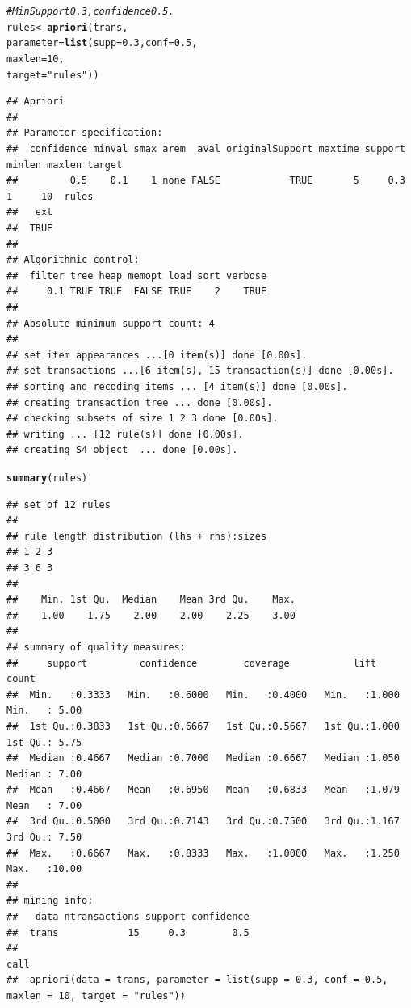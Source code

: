 \documentclass{article}\usepackage[]{graphicx}\usepackage[]{xcolor}
\makeatletter
\newcommand{\hlnum}[1]{\textcolor[rgb]{0.686,0.059,0.569}{#1}}%
\newcommand{\hlstr}[1]{\textcolor[rgb]{0.192,0.494,0.8}{#1}}%
\newcommand{\hlcom}[1]{\textcolor[rgb]{0.678,0.584,0.686}{\textit{#1}}}%
\newcommand{\hlstd}[1]{\textcolor[rgb]{0.345,0.345,0.345}{#1}}%
\newcommand{\hlkwb}[1]{\textcolor[rgb]{0.69,0.353,0.396}{#1}}%
\newcommand{\hlkwc}[1]{\textcolor[rgb]{0.333,0.667,0.333}{#1}}%
\newcommand{\hlkwd}[1]{\textcolor[rgb]{0.737,0.353,0.396}{\textbf{#1}}}%
\newenvironment{kframe}{%
 \def\at@end@of@kframe{}%
 \ifinner\ifhmode%
  \def\at@end@of@kframe{\end{minipage}}%
  \begin{minipage}{\columnwidth}%
 \fi\fi%
 \def\FrameCommand##1{\hskip\@totalleftmargin \hskip-\fboxsep
 \colorbox{shadecolor}{##1}\hskip-\fboxsep
     \hskip-\linewidth \hskip-\@totalleftmargin \hskip\columnwidth}%
 \MakeFramed {\advance\hsize-\width
   \@totalleftmargin\z@ \linewidth\hsize
   \@setminipage}}%
 {\par\unskip\endMakeFramed%
 \at@end@of@kframe}
\newenvironment{knitrout}{}{} %
\makeatother
\begin{document}
\begin{knitrout}
\begin{kframe}
\begin{alltt}
\hlcom{#Min Support 0.3, confidence 0.5.}
\hlstd{rules} \hlkwb{<-} \hlkwd{apriori}\hlstd{(trans,}
                 \hlkwc{parameter} \hlstd{=} \hlkwd{list}\hlstd{(}\hlkwc{supp}\hlstd{=}\hlnum{0.3}\hlstd{,} \hlkwc{conf}\hlstd{=}\hlnum{0.5}\hlstd{,}
                                  \hlkwc{maxlen}\hlstd{=}\hlnum{10}\hlstd{,}
                                  \hlkwc{target}\hlstd{=} \hlstr{"rules"}\hlstd{))}
\end{alltt}
\begin{verbatim}
## Apriori
## 
## Parameter specification:
##  confidence minval smax arem  aval originalSupport maxtime support minlen maxlen target
##         0.5    0.1    1 none FALSE            TRUE       5     0.3      1     10  rules
##   ext
##  TRUE
## 
## Algorithmic control:
##  filter tree heap memopt load sort verbose
##     0.1 TRUE TRUE  FALSE TRUE    2    TRUE
## 
## Absolute minimum support count: 4 
## 
## set item appearances ...[0 item(s)] done [0.00s].
## set transactions ...[6 item(s), 15 transaction(s)] done [0.00s].
## sorting and recoding items ... [4 item(s)] done [0.00s].
## creating transaction tree ... done [0.00s].
## checking subsets of size 1 2 3 done [0.00s].
## writing ... [12 rule(s)] done [0.00s].
## creating S4 object  ... done [0.00s].
\end{verbatim}
\begin{alltt}
\hlkwd{summary}\hlstd{(rules)}
\end{alltt}
\begin{verbatim}
## set of 12 rules
## 
## rule length distribution (lhs + rhs):sizes
## 1 2 3 
## 3 6 3 
## 
##    Min. 1st Qu.  Median    Mean 3rd Qu.    Max. 
##    1.00    1.75    2.00    2.00    2.25    3.00 
## 
## summary of quality measures:
##     support         confidence        coverage           lift           count      
##  Min.   :0.3333   Min.   :0.6000   Min.   :0.4000   Min.   :1.000   Min.   : 5.00  
##  1st Qu.:0.3833   1st Qu.:0.6667   1st Qu.:0.5667   1st Qu.:1.000   1st Qu.: 5.75  
##  Median :0.4667   Median :0.7000   Median :0.6667   Median :1.050   Median : 7.00  
##  Mean   :0.4667   Mean   :0.6950   Mean   :0.6833   Mean   :1.079   Mean   : 7.00  
##  3rd Qu.:0.5000   3rd Qu.:0.7143   3rd Qu.:0.7500   3rd Qu.:1.167   3rd Qu.: 7.50  
##  Max.   :0.6667   Max.   :0.8333   Max.   :1.0000   Max.   :1.250   Max.   :10.00  
## 
## mining info:
##   data ntransactions support confidence
##  trans            15     0.3        0.5
##                                                                                            call
##  apriori(data = trans, parameter = list(supp = 0.3, conf = 0.5, maxlen = 10, target = "rules"))

\end{verbatim}
\end{kframe}
\end{knitrout}
\end{document}
